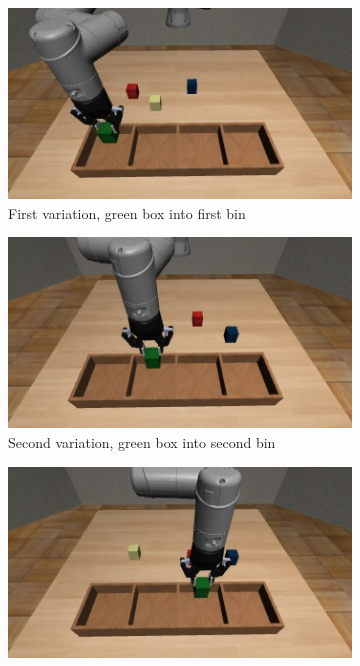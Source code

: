 \begin{figure}[htb]
    \centering
    \begin{subfigure}[b]{0.4\textwidth}
        \centering
        \includegraphics[width=\textwidth]{Figures/images/pick_place/task_1.png}
        \caption{First variation, green box into first bin}
        \label{fig:first_variation}
    \end{subfigure}
    \hfill
    \begin{subfigure}[b]{0.4\textwidth}
        \centering
        \includegraphics[width=\textwidth]{Figures/images/pick_place/task_2.png}
        \caption{Second variation, green box into second bin}
        \label{fig:second_variation}
    \end{subfigure}
    \vfill
    \begin{subfigure}[b]{0.4\textwidth}
        \centering
        \includegraphics[width=\textwidth]{Figures/images/pick_place/task_3.png}

\end{subfigure}
\end{figure}
